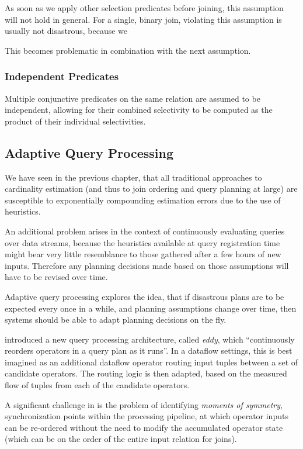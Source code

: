 \documentclass[../index.tex]{subfiles}
\begin{document}
As soon as we apply other selection predicates before joining, this
assumption will not hold in general. For a single, binary join,
violating this assumption is usually not disastrous, because we 

This becomes problematic in
combination with the next assumption.

\subsubsection{Independent Predicates}

Multiple conjunctive predicates on the same relation are assumed to be
independent, allowing for their combined selectivity to be computed as
the product of their individual selectivities.

\subsection{Adaptive Query Processing} \label{technique-adaptive}

We have seen in the previous chapter, that all traditional approaches
to cardinality estimation (and thus to join ordering and query
planning at large) are susceptible to exponentially compounding
estimation errors due to the use of heuristics.

An additional problem arises in the context of continuously evaluating
queries over data streams, because the heuristics available at query
registration time might bear very little resemblance to those gathered
after a few hours of new inputs. Therefore any planning decisions made
based on those assumptions will have to be revised over time.

Adaptive query processing explores the idea, that if disastrous plans
are to be expected every once in a while, and planning assumptions
change over time, then systems should be able to adapt planning
decisions on the fly.

\cite{avnur2000eddies} introduced a new query processing architecture,
called \emph{eddy}, which ``continuously reorders operators in a query
plan as it runs''. In a dataflow settings, this is best imagined as an
additional dataflow operator routing input tuples between a set of
candidate operators. The routing logic is then adapted, based on the
measured flow of tuples from each of the candidate operators.

A significant challenge in \cite{avnur2000eddies} is the problem of
identifying \emph{moments of symmetry}, synchronization points within
the processing pipeline, at which operator inputs can be re-ordered
without the need to modify the accumulated operator state (which can
be on the order of the entire input relation for joins).
\end{document}
